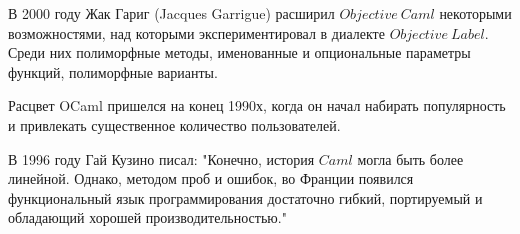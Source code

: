 \documentclass[14pt]{matmex-diploma-custom}
\begin{document}
В 2000 году Жак Гариг (Jacques Garrigue) расширил $Objective\ Caml$ некоторыми возможностями, над которыми экспериментировал в диалекте $Objective\ Label$. Среди них полиморфные методы, именованные и опциональные параметры функций, полиморфные варианты.

Расцвет OCaml пришелся на конец 1990х, когда он начал набирать популярность и привлекать существенное количество пользователей.


В 1996 году Гай Кузино писал: "Конечно, история $Caml$ могла быть более линейной. Однако, методом проб и ошибок, во Франции появился функциональный язык программирования достаточно гибкий, портируемый и обладающий хорошей производительностью."
\end{document}
